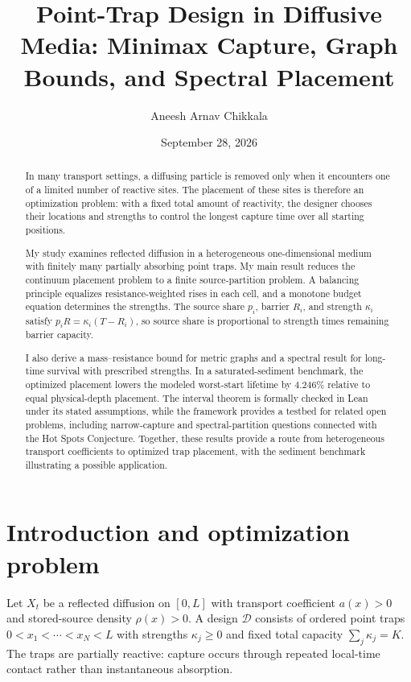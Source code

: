 \documentclass[10pt]{article}
\title{\textbf{Point-Trap Design in Diffusive Media: Minimax Capture, Graph Bounds, and Spectral Placement}}
\author{Aneesh Arnav Chikkala}
\date{September 28, 2026}
\begin{document}
\maketitle

\begin{abstract}
	In many transport settings, a diffusing particle is removed only when it encounters one of a limited number of reactive sites. The placement of these sites is therefore an optimization problem: with a fixed total amount of reactivity, the designer chooses their locations and strengths to control the longest capture time over all starting positions.
	
My study examines reflected diffusion in a heterogeneous one-dimensional medium with finitely many partially absorbing point traps. My main result reduces the continuum placement problem to a finite source-partition problem. A balancing principle equalizes resistance-weighted rises in each cell, and a monotone budget equation determines the strengths. The source share $p_i$, barrier $R_i$, and strength $\kappa_i$ satisfy $p_iR=\kappa_i(T-R_i)$, so source share is proportional to strength times remaining barrier capacity.
	
	I also derive a mass--resistance bound for metric graphs and a spectral result for long-time survival with prescribed strengths. In a saturated-sediment benchmark, the optimized placement lowers the modeled worst-start lifetime by $4.246\%$ relative to equal physical-depth placement. The interval theorem is formally checked in Lean under its stated assumptions, while the framework provides a testbed for related open problems, including narrow-capture and spectral-partition questions connected with the Hot Spots Conjecture. Together, these results provide a route from heterogeneous transport coefficients to optimized trap placement, with the sediment benchmark illustrating a possible application.
\end{abstract}
\section{Introduction and optimization problem}

Let $X_t$ be a reflected diffusion on $[0,L]$ with transport coefficient $a(x)>0$ and stored-source density $\rho(x)>0$. A design $\mathcal D$ consists of ordered point traps $0<x_1<\cdots<x_N<L$ with strengths $\kappa_j\geq0$ and fixed total capacity $\sum_j\kappa_j=K$. The traps are partially reactive: capture occurs through repeated local-time contact rather than instantaneous absorption.
\end{document}
